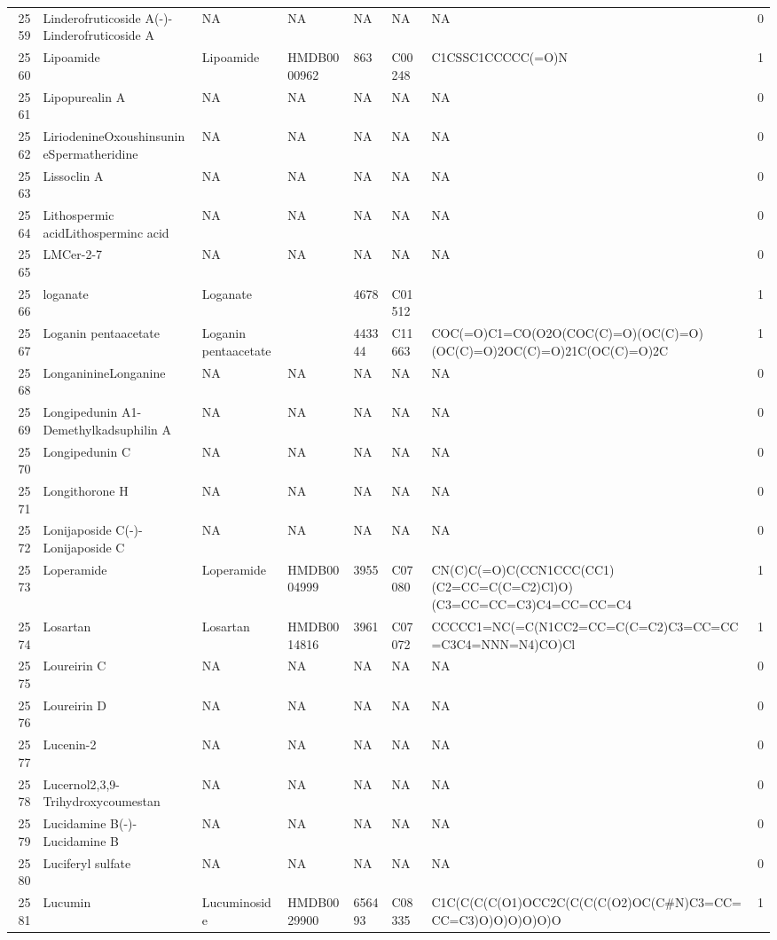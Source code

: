\documentclass[a4paper]{article}
\begin{document}
\begin{longtable}{rlllllll}
  2559 & Linderofruticoside A(-)-Linderofruticoside A & NA & NA & NA & NA & NA & 0 \\ 
  2560 & Lipoamide & Lipoamide & HMDB0000962 & 863 & C00248 & C1CSSC1CCCCC(=O)N & 1 \\ 
  2561 & Lipopurealin A & NA & NA & NA & NA & NA & 0 \\ 
  2562 & LiriodenineOxoushinsunineSpermatheridine & NA & NA & NA & NA & NA & 0 \\ 
  2563 & Lissoclin A & NA & NA & NA & NA & NA & 0 \\ 
  2564 & Lithospermic acidLithosperminc acid & NA & NA & NA & NA & NA & 0 \\ 
  2565 & LMCer-2-7 & NA & NA & NA & NA & NA & 0 \\ 
  2566 & loganate & Loganate &  & 4678 & C01512 &  & 1 \\ 
  2567 & Loganin pentaacetate & Loganin pentaacetate &  & 443344 & C11663 & COC(=O)C1=CO(O2O(COC(C)=O)(OC(C)=O)(OC(C)=O)2OC(C)=O)21C(OC(C)=O)2C & 1 \\ 
  2568 & LonganinineLonganine & NA & NA & NA & NA & NA & 0 \\ 
  2569 & Longipedunin A1-Demethylkadsuphilin A & NA & NA & NA & NA & NA & 0 \\ 
  2570 & Longipedunin C & NA & NA & NA & NA & NA & 0 \\ 
  2571 & Longithorone H & NA & NA & NA & NA & NA & 0 \\ 
  2572 & Lonijaposide C(-)-Lonijaposide C & NA & NA & NA & NA & NA & 0 \\ 
  2573 & Loperamide & Loperamide & HMDB0004999 & 3955 & C07080 & CN(C)C(=O)C(CCN1CCC(CC1)(C2=CC=C(C=C2)Cl)O)(C3=CC=CC=C3)C4=CC=CC=C4 & 1 \\ 
  2574 & Losartan & Losartan & HMDB0014816 & 3961 & C07072 & CCCCC1=NC(=C(N1CC2=CC=C(C=C2)C3=CC=CC=C3C4=NNN=N4)CO)Cl & 1 \\ 
  2575 & Loureirin C & NA & NA & NA & NA & NA & 0 \\ 
  2576 & Loureirin D & NA & NA & NA & NA & NA & 0 \\ 
  2577 & Lucenin-2 & NA & NA & NA & NA & NA & 0 \\ 
  2578 & Lucernol2,3,9-Trihydroxycoumestan & NA & NA & NA & NA & NA & 0 \\ 
  2579 & Lucidamine B(-)-Lucidamine B & NA & NA & NA & NA & NA & 0 \\ 
  2580 & Luciferyl sulfate & NA & NA & NA & NA & NA & 0 \\ 
  2581 & Lucumin & Lucuminoside & HMDB0029900 & 656493 & C08335 & C1C(C(C(C(O1)OCC2C(C(C(C(O2)OC(C\#N)C3=CC=CC=C3)O)O)O)O)O)O & 1 \\ 

\end{longtable}
\end{document}
